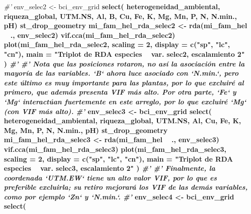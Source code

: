 \documentclass[11pt,]{article}
\newenvironment{Shaded}{\begin{snugshade}}{\end{snugshade}}
\newcommand{\KeywordTok}[1]{\textcolor[rgb]{0.13,0.29,0.53}{\textbf{#1}}}
\newcommand{\DataTypeTok}[1]{\textcolor[rgb]{0.13,0.29,0.53}{#1}}
\newcommand{\DecValTok}[1]{\textcolor[rgb]{0.00,0.00,0.81}{#1}}
\newcommand{\StringTok}[1]{\textcolor[rgb]{0.31,0.60,0.02}{#1}}
\newcommand{\CommentTok}[1]{\textcolor[rgb]{0.56,0.35,0.01}{\textit{#1}}}
\newcommand{\OperatorTok}[1]{\textcolor[rgb]{0.81,0.36,0.00}{\textbf{#1}}}
\newcommand{\NormalTok}[1]{#1}
\begin{document}
\begin{Shaded}
\begin{Highlighting}[]
{{{{{{{\CommentTok{#' }
\NormalTok{env_selec2 <-}\StringTok{ }\NormalTok{bci_env_grid }\OperatorTok{%
\StringTok{  }\KeywordTok{select}\NormalTok{(}
\NormalTok{    heterogeneidad_ambiental,}
\NormalTok{    riqueza_global,}
\NormalTok{    UTM.NS,}
\NormalTok{    Al, B, Cu, Fe, K, Mg, Mn, P, N, N.min., pH) }\OperatorTok{%
\StringTok{  }\NormalTok{st_drop_geometry}
\NormalTok{mi_fam_hel_rda_selec2 <-}\StringTok{ }\KeywordTok{rda}\NormalTok{(mi_fam_hel }\OperatorTok{~}\StringTok{ }\NormalTok{., env_selec2)}
\KeywordTok{vif.cca}\NormalTok{(mi_fam_hel_rda_selec2)}
\KeywordTok{plot}\NormalTok{(mi_fam_hel_rda_selec2,}
     \DataTypeTok{scaling =} \DecValTok{2}\NormalTok{,}
     \DataTypeTok{display =} \KeywordTok{c}\NormalTok{(}\StringTok{"sp"}\NormalTok{, }\StringTok{"lc"}\NormalTok{, }\StringTok{"cn"}\NormalTok{),}
     \DataTypeTok{main =} \StringTok{"Triplot de RDA especies ~ var. selec2, escalamiento 2"}
\NormalTok{)}
\CommentTok{#' }
\CommentTok{#' Nota que las posiciones rotaron, no así la asociación entre la mayoría de las variables. `B` ahora luce asociado con `N.min.`, pero este último es muy importante para las plantas, por lo que excluiré al primero, que además presenta VIF más alto. Por otra parte, `Fe` y `Mg` interactúan fuertemente en este arreglo, por lo que excluiré `Mg` (con VIF más alto).}
\CommentTok{#' }
\NormalTok{env_selec3 <-}\StringTok{ }\NormalTok{bci_env_grid }\OperatorTok{%
\StringTok{  }\KeywordTok{select}\NormalTok{(}
\NormalTok{    heterogeneidad_ambiental,}
\NormalTok{    riqueza_global,}
\NormalTok{    UTM.NS,}
\NormalTok{    Al, Cu, Fe, K, Mg, Mn, P, N, N.min., pH) }\OperatorTok{%
\StringTok{  }\NormalTok{st_drop_geometry}
\NormalTok{mi_fam_hel_rda_selec3 <-}\StringTok{ }\KeywordTok{rda}\NormalTok{(mi_fam_hel }\OperatorTok{~}\StringTok{ }\NormalTok{., env_selec3)}
\KeywordTok{vif.cca}\NormalTok{(mi_fam_hel_rda_selec3)}
\KeywordTok{plot}\NormalTok{(mi_fam_hel_rda_selec3,}
     \DataTypeTok{scaling =} \DecValTok{2}\NormalTok{,}
     \DataTypeTok{display =} \KeywordTok{c}\NormalTok{(}\StringTok{"sp"}\NormalTok{, }\StringTok{"lc"}\NormalTok{, }\StringTok{"cn"}\NormalTok{),}
     \DataTypeTok{main =} \StringTok{"Triplot de RDA especies ~ var. selec3, escalamiento 2"}
\NormalTok{)}
\CommentTok{#'}
\CommentTok{#' Finalmente, la coordenada `UTM.EW` tiene un alto valor VIF, por lo que es preferible excluirla; su retiro mejorará los VIF de las demás variables, como por ejemplo `Zn` y `N.min.`.}
\CommentTok{#' }
\NormalTok{env_selec4 <-}\StringTok{ }\NormalTok{bci_env_grid }\OperatorTok{%
\StringTok{  }\KeywordTok{select}\NormalTok{(}
}}}}}}}}}}}}
\end{Highlighting}
\end{Shaded}
\end{document}
